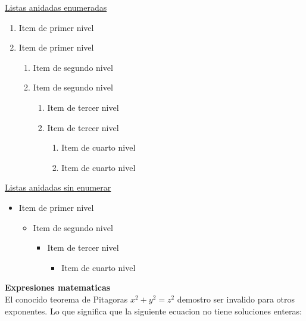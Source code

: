 \documentclass[]{article} %
\begin{document}
        \underline{Listas anidadas enumeradas}
        \begin{enumerate}
            \item Item de primer nivel
            \item Item de primer nivel
            \begin{enumerate}
                \item Item de segundo nivel
                \item Item de segundo nivel
                \begin{enumerate}
                    \item Item de tercer nivel
                    \item Item de tercer nivel
                    \begin{enumerate}
                        \item Item de cuarto nivel
                        \item Item de cuarto nivel 
                    \end{enumerate}
                \end{enumerate}
            \end{enumerate}
        \end{enumerate}

        \underline{Listas anidadas sin enumerar}
        \begin{itemize}
            \item Item de primer nivel
            \begin{itemize}
                \item Item de segundo nivel
                \begin{itemize}
                    \item Item de tercer nivel
                    \begin{itemize}
                        \item Item de cuarto nivel
                    \end{itemize}
                \end{itemize}
            \end{itemize}
        \end{itemize}

        \pagebreak
        \textbf{Expresiones matematicas}\\

        El conocido teorema de Pitagoras \(x^2 + y^2 = z^2\) demostro ser invalido para otros exponentes. Lo que significa que la siguiente ecuacion no tiene soluciones enteras: 
\end{document}

